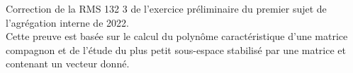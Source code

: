 \begin{preuve}
    Correction de la RMS 132 3 de l'exercice préliminaire du premier sujet de l'agrégation interne de 2022. \\
    Cette preuve est basée sur le calcul du polynôme caractéristique d'une matrice compagnon et de l'étude du plus petit sous-espace stabilisé par une matrice et contenant un vecteur donné. \\
    
    
\end{preuve}
